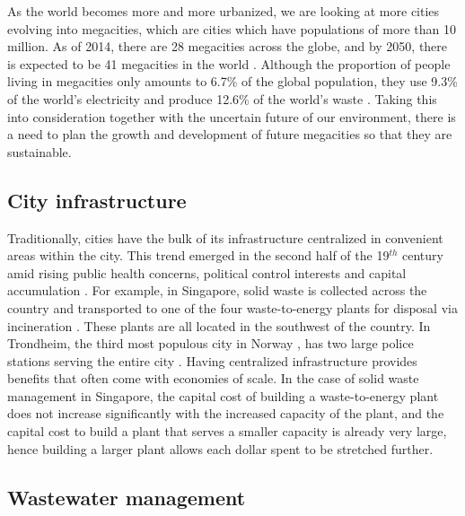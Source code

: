 \documentclass[preprint,12pt,authoryear]{elsarticle}
\begin{document}
As the world becomes more and more urbanized, we are looking at more cities evolving into megacities, which are cities which have populations of more than 10 million. As of 2014, there are 28 megacities across the globe, and by 2050, there is expected to be 41 megacities in the world \citep{wup2014}. Although the proportion of people living in megacities only amounts to 6.7\% of the global population, they use 9.3\% of the world's electricity and produce 12.6\% of the world's waste \citep{kennedy2015}. Taking this into consideration together with the uncertain future of our environment, there is a need to plan the growth and development of future megacities so that they are sustainable. 

\subsection{City infrastructure}
Traditionally, cities have the bulk of its infrastructure centralized in convenient areas within the city. This trend emerged in the second half of the 19$^{th}$ century amid rising public health concerns, political control interests and capital accumulation \citep{gandy2004, dingle2008}. For example, in Singapore, solid waste is collected across the country and transported to one of the four waste-to-energy plants for disposal via incineration \citep{nea2016}. These plants are all located in the southwest of the country.  In Trondheim, the third most populous city in Norway \citep{statistisk2013}, has two large police stations serving the entire city \citep{politinorway}. Having centralized infrastructure provides benefits that often come with economies of scale. In the case of solid waste management in Singapore, the capital cost of building a waste-to-energy plant does not increase significantly with the increased capacity of the plant, and the capital cost to build a plant that serves a smaller capacity is already very large, hence building a larger plant allows each dollar spent to be stretched further.

\subsection{Wastewater management}
\end{document}
